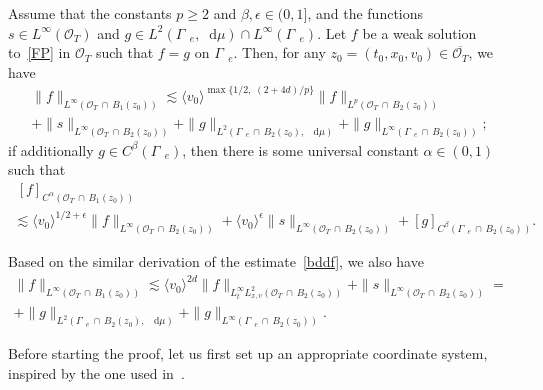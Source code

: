 \documentclass[AHL,Unicode,longabstracts,published]{cedram}
\newcommand*{\dif}{\mathop{}\!\mathrm{d}}
\newcommand*\Ge {\Gamma_{\;\!\!\;\!\!e}}
\newcommand*\OO {\mathcal{O}}
\newcommand{\lvv}{\langle v_0\rangle}
\begin{document}
\begin{prop}\label{local}
Assume that the constants $p\ge2$ and $\beta,\epsilon\in(0,1]$, and the functions $s\in L^\infty(\OO_T)$ and $g\in L^2(\Ge,\dif\mu)\cap L^\infty(\Ge)$. Let $f$ be a weak solution to~\eqref{FP} in $\OO_T$ such that $f=g$ on $\Ge$. Then, for any $z_0=(t_0,x_0,v_0)\in\overline{\OO_T}$, we have
\begin{multline}\label{bddf}
\|f\|_{L^\infty\left(\OO_T\,\cap\,B_1(z_0)\right)}
\lesssim
\lvv^{\max\{1/2,\;\!(2+4d)/p\}}\|f\|_{L^p\left(\OO_T\,\cap \,B_2(z_0)\right)}\\
+\|s\|_{L^\infty\left(\OO_T\,\cap\,B_2(z_0)\right)} 
+\|g\|_{L^2\left(\Ge\,\cap\,B_2(z_0),\;\!\dif\mu\right)} +\|g\|_{L^\infty\left(\Ge\,\cap\,B_2(z_0)\right)};
\end{multline}
if additionally $g\in C^\beta(\Ge)$, then there is some universal constant $\alpha\in(0,1)$ such that
\begin{multline}\label{holderf}
\ [f]_{C^\alpha\left(\OO_T\,\cap\,B_{1}(z_0)\right)}\\
\lesssim
\lvv^{1/2+\epsilon}\|f\|_{L^\infty\left(\OO_T\,\cap \,B_2(z_0)\right)} 
+\lvv^{\epsilon}\|s\|_{L^\infty\left(\OO_T\,\cap\,B_2(z_0)\right)} + [g]_{C^\beta\left(\Ge\,\cap\,B_{2}(z_0)\right)}.
\end{multline}
\end{prop}

\begin{rema}\label{localremark}
Based on the similar derivation of the estimate~\eqref{bddf}, we also have
\begin{multline*}
\|f\|_{L^\infty\left(\OO_T\,\cap\,B_1(z_0)\right)}
\lesssim \lvv^{2d}\|f\|_{L_t^\infty L_{x,v}^2\left(\OO_T\,\cap\,B_2(z_0)\right)} +\|s\|_{L^\infty\left(\OO_T\,\cap \,B_2(z_0)\right)} =\\
+\|g\|_{L^2\left(\Ge\,\cap\,B_2(z_0),\;\!\dif\mu\right)} +\|g\|_{L^\infty\left(\Ge\,\cap\,B_2(z_0)\right)}.
\end{multline*}
\end{rema}

Before starting the proof, let us first set up an appropriate coordinate system, inspired by the one used in~\cite{GHJO}.
\end{document}
